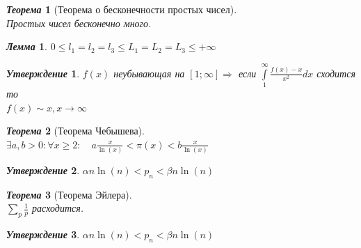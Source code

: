 \documentclass[a4paper,12pt]{article}
\newtheorem{teo2}{\textit{Теорема}}
\newtheorem{utv2}{\textit{Утверждение}}
\newtheorem{lem2}{\textit{Лемма}}
\newcommand{\q}{\quad}
\newcommand{\Ra}{\Rightarrow}
\newcommand{\IL}{\int\limits}
\begin{document}
\begin{formbox}{}
\begin{teo2}[Теорема о бесконечности простых чисел]\q\\
Простых чисел бесконечно много.
\end{teo2}
\end{formbox}
\begin{formbox}{}
\begin{lem2}
$0\le l_1 = l_2 = l_3 \le L_1 = L_2 = L_3 \le +\infty$
\end{lem2}
\end{formbox}
\begin{formbox}{}
\begin{utv2} $f(x)$ неубывающая на $[1;\infty]\Ra$ если $\IL_1^\infty \frac{f(x) - x}{x^2}dx$ сходится то \\$f(x)\sim x, x\to\infty$
\end{utv2}
\end{formbox}
\begin{formbox}{}
\begin{teo2}[Теорема Чебышева]\q\\
$\exists a,b > 0: \forall x \ge 2:\q a\frac{x}{\ln(x)} <\pi(x) <b\frac{x}{\ln(x)} $
\end{teo2}
\end{formbox}
\begin{formbox}{}
\begin{utv2} $\alpha n \ln(n) < p_n < \beta n \ln(n)   $
\end{utv2}
\end{formbox}

\begin{formbox}{}
\begin{teo2}[Теорема Эйлера]\q\\$\sum_p \frac{1}{p}$ расходится.
\end{teo2}
\end{formbox}
\begin{formbox}{}
\begin{utv2} $\alpha n \ln(n) < p_n < \beta n \ln(n)   $
\end{utv2}
\end{formbox}
\end{document}
